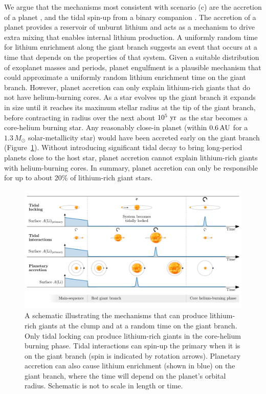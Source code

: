 \documentclass[twocolumn]{aastex62}
\begin{document}
We argue that the mechanisms most consistent with scenario (c) are the 
accretion of a planet \citep{Siess_1999}, and the tidal spin-up from a binary companion \citep{Fekel_1993}. The accretion of a planet provides a reservoir
of unburnt lithium and acts as a mechanism to drive extra mixing that 
enables internal lithium production. 
A uniformly random time for lithium enrichment along the 
giant branch suggests
an event that occurs at a time that depends on the properties of that system.
Given a suitable distribution of exoplanet masses and periods, planet engulfment
is a plausible mechanism that could approximate a uniformly random lithium enrichment time 
on the giant branch.
However, planet accretion can only explain lithium-rich giants that do not have helium-burning cores. 
As a star evolves up the giant branch it expands in size until it reaches its maximum stellar radius at 
the tip of the giant branch, before contracting in radius over the next 
about $10^5~{\rm yr}$ as the star becomes a core-helium burning star. 
Any reasonably close-in planet (within $0.6\,{\rm AU}$ for a $1.3\,M_\odot$ solar-metallicity star) would have been accreted early on the giant branch (Figure~\ref{fig:diagram}).
Without 
introducing significant tidal decay to bring long-period planets close to the host star, planet accretion cannot explain lithium-rich giants with helium-burning cores.
In summary, planet accretion can only be responsible for up to about 20\% of lithium-rich giant stars.


\begin{figure}
	\includegraphics[width=\textwidth]{diagram}
	\caption{
		A schematic illustrating the mechanisms that can produce lithium-rich giants at the clump and at a random time on the giant branch. 
		Only tidal locking can produce lithium-rich giants in the core-helium burning phase. Tidal interactions can spin-up the primary when it is on the giant branch (spin is indicated by rotation arrows). Planetary accretion can also cause lithium enrichment (shown in blue) on the giant branch, where the time will depend on the planet's orbital radius. Schematic is not to scale in length or time.}
	\label{fig:diagram}
\end{figure}
\end{document}
